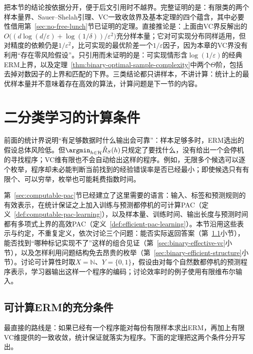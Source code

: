 把本节的结论按依据分开，便于后文引用时不越界。完整证明的是：有限类的两个样本量界、Sauer--Shelah引理、VC一致收敛界及基本定理的四个蕴含，其中必要性借用第~\ref{sec:no-free-lunch}节已证明的定理。直接推论是：上面由VC界反解出的$O\bigl((d\log(d/\varepsilon)+\log(1/\delta))/\varepsilon^2\bigr)$充分样本量；它对可实现分布同样适用，但对精度的依赖仍是$1/\varepsilon^2$，比可实现的最优阶差一个$1/\varepsilon$因子，因为本章的VC界没有利用“存在零风险假设”。只引用而未证明的是：可实现情形含$\log(1/\varepsilon)$的经典ERM上界，以及定理~\ref{thm:binary-optimal-sample-complexity}中两个$\Theta$阶，包括去掉对数因子的上界和匹配的下界。三类结论都只讲样本，不讲计算：统计上的最优样本量并不意味着存在高效的算法，计算问题是下一节的内容。

\section{二分类学习的计算条件}
\label{sec:computable-binary-learning}

前面的统计界说明“有足够数据时什么输出会可靠”：样本足够多时，ERM选出的假设总体风险低。但$\argmin_{h\in\mathcal H}\hat R_S(h)$只规定了要找什么，没有给出一个会停机的寻找程序；VC维有限也不会自动给出这样的程序。例如，无限多个候选可以逐个枚举，程序却未必能判断当前找到的经验错误率是否已经最小；即使候选只有有限个、可以穷举，枚举也可能耗费指数时间。

第~\ref{sec:computable-pac}节已经建立了这里需要的语言：输入、标签和预测规则的有效表示，在统计保证之上加入训练与预测都停机的可计算PAC（定义~\ref{def:computable-pac-learning}），以及样本量、训练时间、输出长度与预测时间都有多项式上界的高效PAC（定义~\ref{def:efficient-pac-learning}）。本节沿用这些表示与约定，不重复定义，依次讨论三个问题：能否实际返回答案（第~\ref{sec:binary-computable-erm}小节），能否找到“哪种标记实现不了”这样的组合见证（第~\ref{sec:binary-effective-vc}小节），以及怎样利用问题结构免去昂贵的枚举（第~\ref{sec:binary-efficient-structure}小节）。讨论可计算性时取$X=\mathbb N$、$Y=\{0,1\}$，假设由对每个自然数都停机的预测程序表示，学习器输出这样一个程序的编码；讨论效率时的例子使用有限维布尔输入。

\subsection{可计算ERM的充分条件}
\label{sec:binary-computable-erm}

最直接的路线是：如果已经有一个程序能对每份有限样本求出ERM，再加上有限VC维提供的一致收敛，统计保证就落实为程序。下面的定理把这两个条件分开写出。

